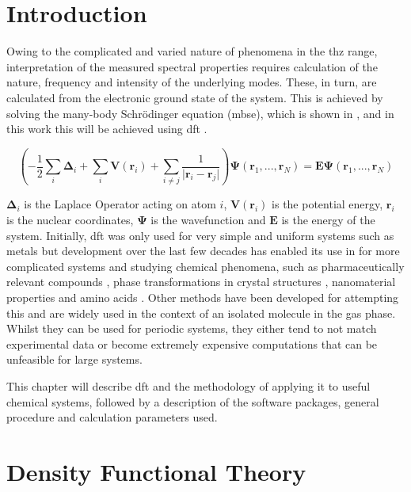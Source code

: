 \section{Introduction}
Owing to the complicated and varied nature of phenomena in the \acrshort{thz} range, interpretation of the measured spectral properties requires calculation of the nature, frequency and intensity of the underlying modes. These, in turn, are calculated from the electronic ground state of the system. This is achieved by solving the many-body Schr\"{o}dinger equation (\acrshort{mbse}), which is shown in , and in this work this will be achieved using \acrfull{dft} \cite{Kohn1965}.

\begin{equation}
\left( -\frac{1}{2}\sum_i\boldsymbol{\Delta}_i + \sum_i \boldsymbol{V}(\mathbf{r}_i) + \sum_{i\neq j}\frac{1}{ \lvert \mathbf{r}_i - \mathbf{r}_j \rvert } \right) \boldsymbol{\Psi} (\mathbf{r}_1, ..., \mathbf{r}_N) = \boldsymbol{E}\boldsymbol{\Psi} (\mathbf{r}_1, ..., \mathbf{r}_N)
\label{eqn:MBSE}
\end{equation}

\(\boldsymbol{\Delta}_i\) is the Laplace Operator acting on atom \(i\), \(\boldsymbol{V}(\mathbf{r}_i)\) is the potential energy, \(\mathbf{r}_i\) is the nuclear coordinates, \(\boldsymbol{\Psi}\) is the wavefunction and \(\boldsymbol{E}\) is the energy of the system. Initially, \acrshort{dft} was only used for very simple and uniform systems such as metals but development over the last few decades has enabled its use in for more complicated systems and studying chemical phenomena, such as pharmaceutically relevant compounds \cite{Berzins2020}, phase transformations in crystal structures \cite{Ruggiero2018, Paul2019}, nanomaterial properties \cite{Makkar2021} and amino acids \cite{Hachtel2019}. Other methods have been developed for attempting this and are widely used in the context of an isolated molecule in the gas phase. Whilst they can be used for periodic systems, they either tend to not match experimental data or become extremely expensive computations that can be unfeasible for large systems.

This chapter will describe \acrshort{dft} and the methodology of applying it to useful chemical systems, followed by a description of the software packages, general procedure and calculation parameters used. 

\section{Density Functional Theory}
\label{sec:DFTheory}
